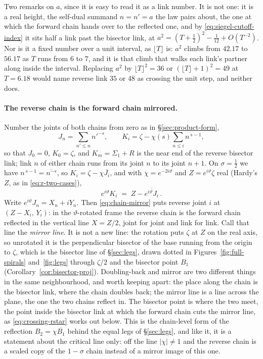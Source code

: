 \documentclass[11pt]{article}
\theoremstyle{definition}
\begin{document}
Two remarks on $a$, since it is easy to read it as a link number. It is not one:
it is a real height, the self-dual summand $n=n'=a$ the law pairs about, the
one at which the forward chain hands over to the reflected one, and by
\eqref{eq:siegel-cutoff-index} it sits half a link past the bisector link, at $a^{2}=(T+\tfrac12)^{2}-\tfrac1{12}+O(T^{-2})$. Nor is it
a fixed number over a unit interval, as $\lfloor T\rfloor$ is: $a^{2}$ climbs
from $42.17$ to $56.17$ as $T$ runs from $6$ to $7$, and it is that climb that
walks each link's partner along inside the interval. Replacing $a^{2}$ by
$\lfloor T\rfloor^{2}=36$ or $(\lfloor T\rfloor+1)^{2}=49$ at $T=6.18$ would
name reverse link $35$ or $48$ as crossing the unit step, and neither does.

\paragraph{The reverse chain is the forward chain mirrored.} Number the joints
of both chains from zero as in \S\ref{sec:product-form},
\begin{equation}\label{eq:crossing-joints}
J_n=\sum_{n'\leq n}n'^{-s},
\qquad
K_i=\zeta-\chi(s)\sum_{n\leq i}n^{\,s-1},
\end{equation}
so that $J_0=0$, $K_0=\zeta$, and $K_m=\Sigma_1+R$ is the near end of the
reverse bisector link; link $n$ of either chain runs from its joint $n$ to its
joint $n+1$. On $\sigma=\tfrac12$ we have $n^{\,s-1}=\overline{n^{-s}}$, so
$K_i=\zeta-\chi\overline{J_i}$, and with $\chi=e^{-2i\vartheta}$ and
$Z=e^{i\vartheta}\zeta$ real (Hardy's $Z$, as in \eqref{eq:r-two-cases}),
\begin{equation}\label{eq:chain-mirror}
e^{i\vartheta}K_i \;=\; Z-\overline{e^{i\vartheta}J_i}\,.
\end{equation}
Write $e^{i\vartheta}J_n=X_n+iY_n$. Then \eqref{eq:chain-mirror} puts reverse
joint $i$ at $(Z-X_i,\,Y_i)$: in the $\vartheta$-rotated frame the reverse chain
is the forward chain reflected in the vertical line $X=Z/2$, joint for joint and
link for link. Call that line the \emph{mirror line}. It is not a new line: the
rotation puts $\zeta$ at $Z$ on the real axis, so unrotated it is the
perpendicular bisector of the base running from the origin to $\zeta$, which is
the bisector line of \S\ref{sec:legs}, drawn dotted in
Figures~\ref{fig:full-spirals} and~\ref{fig:legs} through $\zeta/2$ and the
bisector point $B_1$ (Corollary~\ref{cor:bisector-proj}). Doubling-back and mirror are
two different things in the same neighbourhood, and worth keeping apart: the
place along the chain is the bisector link, where the chain doubles
back; the mirror line is a line across the plane, the one the two chains
reflect in. The bisector point is where the two meet, the point inside the
bisector link at which the forward chain cuts the mirror line, as
\eqref{eq:crossing-rstar} works out below. This is the
chain-level form of the reflection
$B_2=\chi\overline{B_1}$ behind the equal legs of \S\ref{sec:legs}, and like it,
it is a statement about the critical line only: off the line $|\chi|\neq1$ and
the reverse chain is a scaled copy of the $1-\sigma$ chain instead of a mirror
image of this one.
\end{document}
